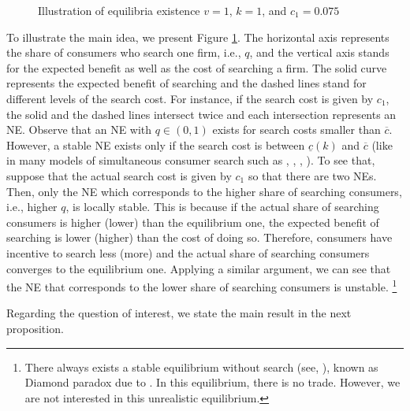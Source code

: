 \documentclass[12pt]{article}
\begin{document}
\begin{figure}[h]
	\centering
	\caption{Illustration of equilibria existence
	$v=1$, $k=1$, and $c_1 = 0.075$}
	\label{fig:equil_q1}
\end{figure}

To illustrate the main idea, we present Figure 
\ref{fig:equil_q1}.  The horizontal axis represents the share of 
consumers who search one firm, i.e., $q$, and the vertical axis 
stands for the expected benefit as well as the cost of searching 
a firm.  The solid curve represents the expected benefit of 
searching and the dashed lines stand for different levels of the 
search cost.  For instance, if the search cost is given by 
$c_1$, the solid and the dashed lines intersect twice and each 
intersection represents an NE.  Observe that an NE with $q \in 
(0,1)$ exists for search costs smaller than $\overline{c}$.  
However, a stable NE exists only if the search cost is between 
$\underline{c}(k)$ and $\overline{c}$ (like in many models of 
simultaneous consumer search such as \cite{burdettjudd1983}, 
\cite{fershtmanfishman1992}, \cite{janssenmoraga2004}, 
\cite{atayev2019a}).  To see that, suppose that the actual 
search cost is given by $c_1$ so that there are two NEs.  Then, 
only the NE which corresponds to the higher share of searching 
consumers, i.e., higher $q$, is locally stable.  This is because 
if the actual share of searching consumers is higher (lower) 
than the equilibrium one, the expected benefit of searching is 
lower (higher) than the cost of doing so.  Therefore, consumers 
have incentive to search less (more) and the actual share of 
searching consumers converges to the equilibrium one.  Applying 
a similar argument, we can see that the NE that corresponds to 
the lower share of searching consumers is unstable.%
\footnote{There always exists a stable equilibrium without 
	search (see, \cite{galeotti2004}), known as Diamond paradox 
	due to \cite{diamond1971}.  In this equilibrium, there is no 
	trade.  However, we are not interested in this unrealistic 
	equilibrium.}



Regarding the question of interest, we state the main result in 
the next proposition. 
\end{document}
